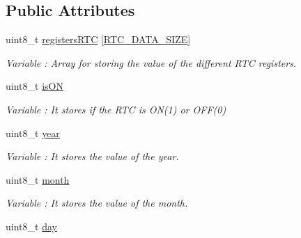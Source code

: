 \subsection*{Public Attributes}
\begin{DoxyCompactItemize}
\item 
uint8\+\_\+t \hyperlink{class_wasp_r_t_c_abd6b0ce126ca222db1ce3a7d97d9c9c2}{registers\+R\+TC} \mbox{[}\hyperlink{_wasp_r_t_c_8h_aeca19c709b2c1ae0c6d1f586a80acf5d}{R\+T\+C\+\_\+\+D\+A\+T\+A\+\_\+\+S\+I\+ZE}\mbox{]}
\begin{DoxyCompactList}\small\item\em Variable \+: Array for storing the value of the different R\+TC registers. \end{DoxyCompactList}\item 
uint8\+\_\+t \hyperlink{class_wasp_r_t_c_a3f2475e446dd730b6dccb10bc2f64fb5}{is\+ON}\hypertarget{class_wasp_r_t_c_a3f2475e446dd730b6dccb10bc2f64fb5}{}\label{class_wasp_r_t_c_a3f2475e446dd730b6dccb10bc2f64fb5}

\begin{DoxyCompactList}\small\item\em Variable \+: It stores if the R\+TC is O\+N(1) or O\+F\+F(0) \end{DoxyCompactList}\item 
uint8\+\_\+t \hyperlink{class_wasp_r_t_c_ad646e9d4a4255e945ca438ccc8f85f3e}{year}\hypertarget{class_wasp_r_t_c_ad646e9d4a4255e945ca438ccc8f85f3e}{}\label{class_wasp_r_t_c_ad646e9d4a4255e945ca438ccc8f85f3e}

\begin{DoxyCompactList}\small\item\em Variable \+: It stores the value of the year. \end{DoxyCompactList}\item 
uint8\+\_\+t \hyperlink{class_wasp_r_t_c_ac9753d846137f17f54c9af1dc1dc9902}{month}\hypertarget{class_wasp_r_t_c_ac9753d846137f17f54c9af1dc1dc9902}{}\label{class_wasp_r_t_c_ac9753d846137f17f54c9af1dc1dc9902}

\begin{DoxyCompactList}\small\item\em Variable \+: It stores the value of the month. \end{DoxyCompactList}\item 
uint8\+\_\+t \hyperlink{class_wasp_r_t_c_a42d32d3f7881c8cf99b453752dac71b8}{day}\hypertarget{class_wasp_r_t_c_a42d32d3f7881c8cf99b453752dac71b8}{}\label{class_wasp_r_t_c_a42d32d3f7881c8cf99b453752dac71b8}


\end{DoxyCompactItemize}
